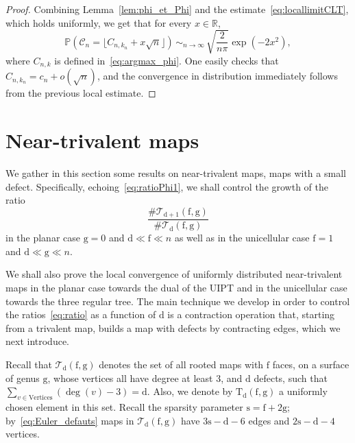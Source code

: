 \documentclass[10pt]{amsart}
\theoremstyle{plain}
\theoremstyle{definition}
\theoremstyle{remark}
\newcommand{\R}{\mathbb{R}}
\renewcommand{\P}{\mathbb{P}}
\newcommand{\Triv}{\mathrm{T}}
\newcommand{\face}{\mathrm{f}}
\newcommand{\defect}{\mathrm{d}}
\newcommand{\gen}{\mathrm{g}}
\newcommand{\spar}{\mathrm{s}}
\newcommand{\equi}[1][n]{\,\mathop{\sim}^{}_{#1 \to \infty}\,}
\begin{document}
\begin{proof}
Combining Lemma~\ref{lem:phi_et_Phi} and the estimate~\eqref{eq:locallimitCLT}, which holds uniformly,
we get that for every $x\in\R$,\vspace*{-3pt}
\[
\P(\mathcal{C}_{n}=\lfloor C_{n,k_{n}}+x\sqrt{n} \rfloor) \equi \sqrt{\frac{2}{n\pi}} \exp\left(-2 x^{2}\right),
\]
where $C_{n,k}$ is defined in~\eqref{eq:argmax_phi}. One easily checks that $C_{n,k_{n}} = c_n + o(\sqrt{n})$, and the convergence in distribution immediately follows from the previous local estimate.
\end{proof}

\section{Near-trivalent maps}
\label{sec:defauts_bis}

We gather in this section some results on near-trivalent maps, \ie maps with a small defect. Specifically, echoing~\eqref{eq:ratioPhi1}, we shall control the growth of the ratio\vspace*{-3pt}
\begin{equation}\label{eq:ratio}
\frac{\# \mathcal{T}_{\defect+1}(\face, \gen)}{ \# \mathcal{T}_{\defect}(\face, \gen)}
\end{equation}
in the planar case $\gen=0$ and $\defect \ll \face \ll n$ as well as in the unicellular case $\face=1$ and $\defect \ll \gen \ll n$.

We shall also prove the local convergence of uniformly distributed near-trivalent maps in the planar case towards the dual of the UIPT and in the unicellular case towards the three regular tree. The main technique we develop in order to control the ratios~\eqref{eq:ratio} as a function of $ \defect$ is a contraction operation that, starting from a trivalent map, builds a map with defects by contracting edges, which we next introduce.

Recall that $\mathcal{T}_{\defect}{(\face,\gen)}$ denotes the set of all rooted maps with $ \face$ faces, on a surface of genus $ \gen$, whose vertices all have degree at least $3$, and $\defect$ defects, \ie such that $\sum_{v \in \mathrm{Vertices}} (\deg(v)-3) = \defect$. Also, we denote by $\Triv_{ \defect}(\face,\gen)$ a uniformly chosen element in this set.
Recall the sparsity parameter $\spar=\face+2\gen$; by~\eqref{eq:Euler_defauts} maps in $\mathcal{T}_{\defect}{(\face,\gen)}$ have $3\spar-\defect-6$ edges and $2\spar-\defect-4$ vertices.
\end{document}
